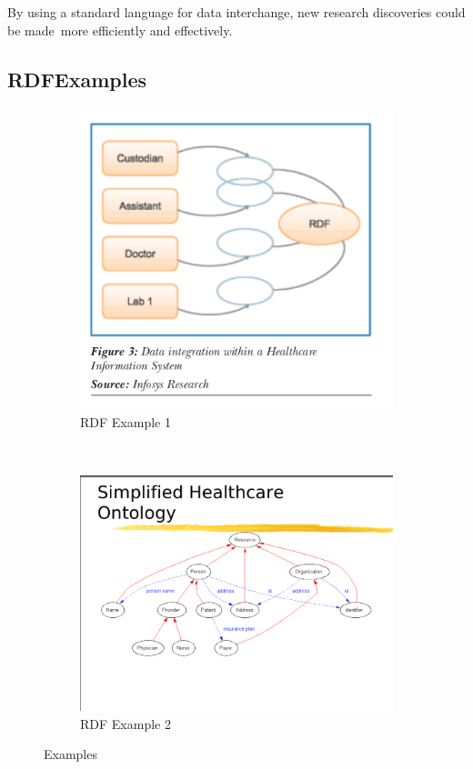   \noindent By using a standard language for data interchange, new research discoveries could be made\
  more efficiently and effectively.\

  \subsection{RDFExamples}
  \begin{figure}[h!]
    \begin{subfigure}[b]{.5\linewidth}
      \includegraphics[width=1.0\textwidth]{rdfh.png}
      \caption{RDF Example 1}
      \label{fig:third}
    \end{subfigure}
    ~
    \begin{subfigure}[b]{.5\linewidth}
      \includegraphics[trim=4 1 1 7,clip,width=\textwidth]{rdf1.png}
      \caption{RDF Example 2}
      \label{fig:fourth}
    \end{subfigure}
    \caption{Examples}
    \label{fig:rdf_examples}
  \end{figure}

